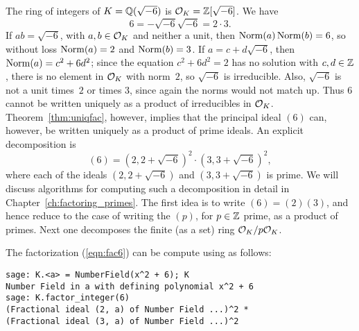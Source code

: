 \begin{example}
The ring of integers of $K=\mathbb{Q}(\sqrt{-6})$ is $\mathcal{O}_K=\mathbb{Z}[\sqrt{-6}]$.
We have
$$
  6 = -\sqrt{-6}\sqrt{-6} = 2 \cdot 3.
$$ If $ab=\sqrt{-6}$, with $a,b\in \mathcal{O}_K$ and neither a unit, then
$\operatorname{Norm}(a)\operatorname{Norm}(b) = 6$, so without loss $\operatorname{Norm}(a)=2$ and
$\operatorname{Norm}(b)=3$. If $a=c + d\sqrt{-6}$, then $\operatorname{Norm}(a) = c^2 + 6d^2$;
since the equation $c^2 + 6d^2 = 2$ has no solution with $c,d\in\mathbb{Z}$,
there is no element in $\mathcal{O}_K$ with norm~$2$, so $\sqrt{-6}$ is
irreducible.  Also, $\sqrt{-6}$ is not a unit times~$2$ or times $3$,
since again the norms would not match up.  Thus $6$ cannot be written
uniquely as a product of irreducibles in $\mathcal{O}_K$.
Theorem~\ref{thm:uniqfac}, however, implies that the principal
ideal $(6)$ can, however, be
written uniquely as a product of prime ideals.
An explicit decomposition is
\begin{equation}\label{eqn:fac6}
(6) = (2, 2+\sqrt{-6})^2 \cdot (3,3+\sqrt{-6})^2,
\end{equation}
where each of the ideals $(2, 2+\sqrt{-6})$ and $(3, 3+\sqrt{-6})$ is
prime.  We will discuss algorithms for computing such a decomposition
in detail in Chapter~\ref{ch:factoring_primes}.  The first idea is to
write $(6)=(2)(3)$, and hence reduce to the case of writing the $(p)$,
for $p\in\mathbb{Z}$ prime, as a product of primes.  Next one decomposes the
finite (as a set) ring $\mathcal{O}_K/p\mathcal{O}_K$.

The factorization (\ref{eqn:fac6}) can be compute using
\sage{} as follows:
\begin{lstlisting}
sage: K.<a> = NumberField(x^2 + 6); K
Number Field in a with defining polynomial x^2 + 6
sage: K.factor_integer(6)
(Fractional ideal (2, a) of Number Field ...)^2 *
(Fractional ideal (3, a) of Number Field ...)^2
\end{lstlisting}

%

\end{example}



